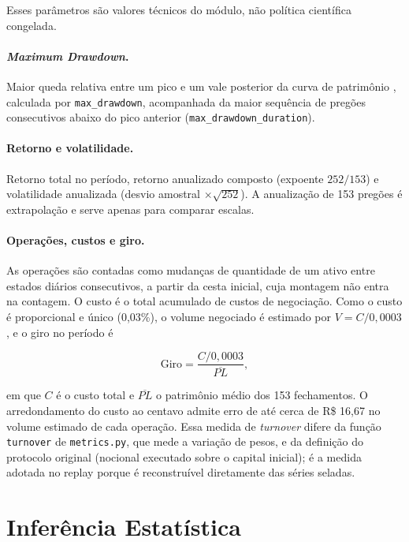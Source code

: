 \documentclass{eic-bcc-tcc}
\begin{document}
\noindent Esses parâmetros são valores técnicos do módulo, não política científica congelada.

\paragraph{\textit{Maximum Drawdown}.} Maior queda relativa entre um pico e um vale posterior da curva de patrimônio \citep{Magdon2004}, calculada por \texttt{max\_drawdown}, acompanhada da maior sequência de pregões consecutivos abaixo do pico anterior (\texttt{max\_drawdown\_duration}).

\paragraph{Retorno e volatilidade.} Retorno total no período, retorno anualizado composto (expoente $252/153$) e volatilidade anualizada (desvio amostral $\times\sqrt{252}$). A anualização de 153 pregões é extrapolação e serve apenas para comparar escalas.

\paragraph{Operações, custos e giro.} As operações são contadas como mudanças de quantidade de um ativo entre estados diários consecutivos, a partir da cesta inicial, cuja montagem não entra na contagem. O custo é o total acumulado de custos de negociação. Como o custo é proporcional e único (0,03\%), o volume negociado é estimado por $V = C / 0{,}0003$, e o giro no período é

\begin{equation}
\text{Giro} = \frac{C / 0{,}0003}{\overline{PL}},
\label{eq:met-giro}
\end{equation}

\noindent em que $C$ é o custo total e $\overline{PL}$ o patrimônio médio dos 153 fechamentos. O arredondamento do custo ao centavo admite erro de até cerca de R\$ 16,67 no volume estimado de cada operação. Essa medida de \textit{turnover} difere da função \texttt{turnover} de \texttt{metrics.py}, que mede a variação de pesos, e da definição do protocolo original (nocional executado sobre o capital inicial); é a medida adotada no replay porque é reconstruível diretamente das séries seladas.

\section{Inferência Estatística}
\label{sec:met-inferencia}
\end{document}
